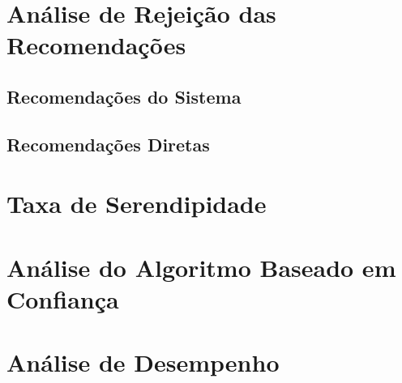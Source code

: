 
\section{Análise de Rejeição das Recomendações}
\label{sec:analise_de_rejeicao_das_recomendacoes}

\subsection{Recomendações do Sistema}

\subsection{Recomendações Diretas}


\section{Taxa de Serendipidade}
\label{sec:taxa_de_serendipidade}


\section{Análise do Algoritmo Baseado em Confiança}
\label{sec:analise_do_algoritmo_baseado_em_confianca}


\section{Análise de Desempenho}
\label{sec:analise_de_desempenho}

